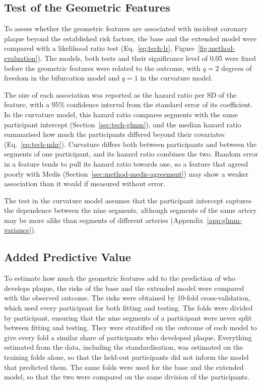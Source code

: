\subsection{Test of the Geometric Features}
\label{sec:method-test}

To assess whether the geometric features are associated with incident coronary plaque beyond the established risk factors, the base and the extended model were compared with a likelihood ratio test (Eq.~\eqref{eq:tech-lr}, Figure~\ref{fig:method-evaluation}).
The models, both tests and their significance level of 0.05 were fixed before the geometric features were related to the outcome, with $q = 2$ degrees of freedom in the bifurcation model and $q = 1$ in the curvature model.

The size of each association was reported as the hazard ratio per SD of the feature, with a 95\% confidence interval from the standard error of its coefficient.
In the curvature model, this hazard ratio compares segments with the same participant intercept (Section~\ref{sec:tech-glmm}), and the median hazard ratio summarised how much the participants differed beyond their covariates (Eq.~\eqref{eq:tech-mhr}).
Curvature differs both between participants and between the segments of one participant, and its hazard ratio combines the two.
Random error in a feature tends to pull its hazard ratio towards one, so a feature that agreed poorly with Medis (Section~\ref{sec:method-medis-agreement}) may show a weaker association than it would if measured without error.

The test in the curvature model assumes that the participant intercept captures the dependence between the nine segments, although segments of the same artery may be more alike than segments of different arteries (Appendix~\ref{app:glmm-variance}).

\subsection{Added Predictive Value}
\label{sec:method-added-value}

To estimate how much the geometric features add to the prediction of who develops plaque, the risks of the base and the extended model were compared with the observed outcome.
\label{sec:method-cv}%
The risks were obtained by 10-fold cross-validation, which used every participant for both fitting and testing.
The folds were divided by participant, ensuring that the nine segments of a participant were never split between fitting and testing.
They were stratified on the outcome of each model to give every fold a similar share of participants who developed plaque.
Everything estimated from the data, including the standardisation, was estimated on the training folds alone, so that the held-out participants did not inform the model that predicted them.
The same folds were used for the base and the extended model, so that the two were compared on the same division of the participants.

